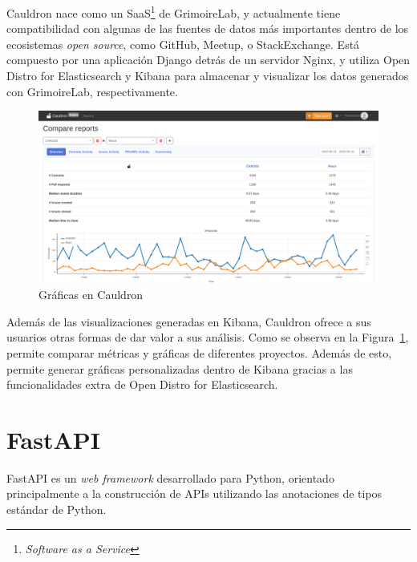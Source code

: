 Cauldron nace como un SaaS\footnote{\emph{Software as a Service}} de GrimoireLab, y actualmente tiene compatibilidad con algunas de las fuentes de datos más importantes dentro de los ecosistemas \emph{open source}, como GitHub, Meetup, o StackExchange. Está compuesto por una aplicación Django detrás de un servidor Nginx, y utiliza Open Distro for Elasticsearch y Kibana para almacenar y visualizar los datos generados con GrimoireLab, respectivamente.

\begin{figure}[ht]
    \centering
    \includegraphics[width=\textwidth]{Figures/cauldron-charts}
    \decoRule
    \caption[Cauldron (Gráficas)]{Gráficas en Cauldron \emph{\parencite{Reference13}}}
    \label{fig:cauldron-charts}
\end{figure}

Además de las visualizaciones generadas en Kibana, Cauldron ofrece a sus usuarios otras formas de dar valor a sus análisis. Como se observa en la Figura~\ref{fig:cauldron-charts}, permite comparar métricas y gráficas de diferentes proyectos. Además de esto, permite generar gráficas personalizadas dentro de Kibana gracias a las funcionalidades extra de Open Distro for Elasticsearch.


\section{FastAPI}\label{sec:fastapi}

FastAPI es un \emph{web framework} desarrollado para Python, orientado principalmente a la construcción de APIs utilizando las anotaciones de tipos estándar de Python. \emph{\parencite{Reference14}}

